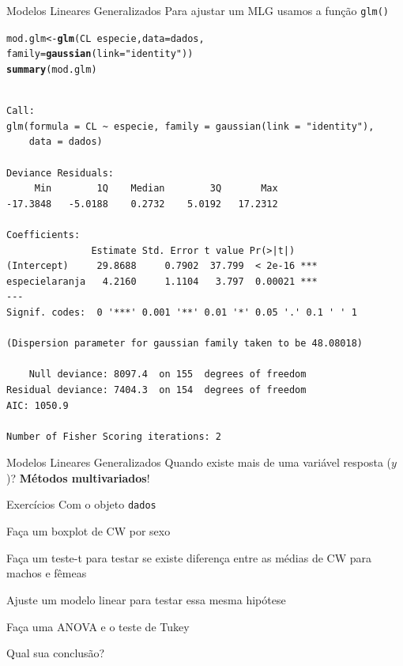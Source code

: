 \documentclass[10pt]{beamer}\usepackage[]{graphicx}\usepackage[]{color}
\makeatletter
\newcommand{\hlstr}[1]{\textcolor[rgb]{0.192,0.494,0.8}{#1}}%
\newcommand{\hlopt}[1]{\textcolor[rgb]{0,0,0}{#1}}%
\newcommand{\hlstd}[1]{\textcolor[rgb]{0.345,0.345,0.345}{#1}}%
\newcommand{\hlkwb}[1]{\textcolor[rgb]{0.69,0.353,0.396}{#1}}%
\newcommand{\hlkwc}[1]{\textcolor[rgb]{0.333,0.667,0.333}{#1}}%
\newcommand{\hlkwd}[1]{\textcolor[rgb]{0.737,0.353,0.396}{\textbf{#1}}}%
\newenvironment{kframe}{%
 \def\at@end@of@kframe{}%
 \ifinner\ifhmode%
  \def\at@end@of@kframe{\end{minipage}}%
  \begin{minipage}{\columnwidth}%
 \fi\fi%
 \def\FrameCommand##1{\hskip\@totalleftmargin \hskip-\fboxsep
 \colorbox{shadecolor}{##1}\hskip-\fboxsep
     \hskip-\linewidth \hskip-\@totalleftmargin \hskip\columnwidth}%
 \MakeFramed {\advance\hsize-\width
   \@totalleftmargin\z@ \linewidth\hsize
   \@setminipage}}%
 {\par\unskip\endMakeFramed%
 \at@end@of@kframe}
\newenvironment{knitrout}{}{} %
\theoremstyle{definition}
\makeatother
\begin{document}
\begin{frame}[fragile=singleslide]{Modelos Lineares Generalizados}
Para ajustar um MLG usamos a função \texttt{glm()}
\begin{knitrout}\footnotesize
{}\color{fgcolor}\begin{kframe}
\begin{alltt}
\hlstd{mod.glm} \hlkwb{<-} \hlkwd{glm}\hlstd{(CL} \hlopt{~} \hlstd{especie,} \hlkwc{data} \hlstd{= dados,}
               \hlkwc{family} \hlstd{=} \hlkwd{gaussian}\hlstd{(}\hlkwc{link} \hlstd{=} \hlstr{"identity"}\hlstd{))}
\hlkwd{summary}\hlstd{(mod.glm)}
\end{alltt}
\begin{verbatim}

Call:
glm(formula = CL ~ especie, family = gaussian(link = "identity"), 
    data = dados)

Deviance Residuals: 
     Min        1Q    Median        3Q       Max  
-17.3848   -5.0188    0.2732    5.0192   17.2312  

Coefficients:
               Estimate Std. Error t value Pr(>|t|)    
(Intercept)     29.8688     0.7902  37.799  < 2e-16 ***
especielaranja   4.2160     1.1104   3.797  0.00021 ***
---
Signif. codes:  0 '***' 0.001 '**' 0.01 '*' 0.05 '.' 0.1 ' ' 1

(Dispersion parameter for gaussian family taken to be 48.08018)

    Null deviance: 8097.4  on 155  degrees of freedom
Residual deviance: 7404.3  on 154  degrees of freedom
AIC: 1050.9

Number of Fisher Scoring iterations: 2
\end{verbatim}
\end{kframe}
\end{knitrout}
\end{frame}

\begin{frame}[fragile=singleslide]{Modelos Lineares Generalizados}
Quando existe mais de uma variável resposta ($y$)? \textbf{Métodos
  multivariados}!
\end{frame}

\begin{frame}[fragile=singleslide]{Exercícios}
Com o objeto \texttt{dados}
\begin{compactenum}[(1)]
\item Faça um boxplot de CW por sexo
\item Faça um teste-t para testar se existe diferença entre as médias de
  CW para machos e fêmeas
\item Ajuste um modelo linear para testar essa mesma hipótese
\item Faça uma ANOVA e o teste de Tukey
\end{compactenum}
Qual sua conclusão?
\end{frame}
\end{document}
